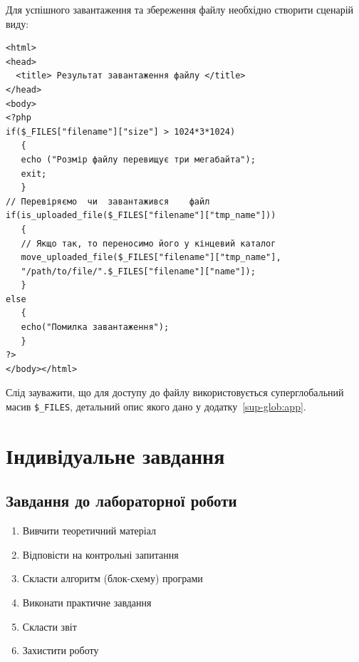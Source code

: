 Для успішного завантаження та збереження файлу необхідно створити сценарій виду:


\begin{lstlisting}[caption=Завантаження файлу на сервер]
<html>
<head>
  <title> Результат завантаження файлу </title>
</head>
<body>
<?php
if($_FILES["filename"]["size"] > 1024*3*1024)
   {
   echo ("Розмір файлу перевищує три мегабайта");
   exit;
   }
// Перевіряємо	чи	завантажився	файл
if(is_uploaded_file($_FILES["filename"]["tmp_name"]))
   {
   // Якщо так, то переносимо його у кінцевий каталог
   move_uploaded_file($_FILES["filename"]["tmp_name"], 
   "/path/to/file/".$_FILES["filename"]["name"]);
   } 
else 
   {
   echo("Помилка завантаження");
   }
?>
</body></html>
\end{lstlisting}

Слід зауважити, що для доступу до файлу використовується суперглобальний масив \verb'$_FILES', детальний опис якого дано у додатку~\ref{sup-glob:app}.



 
\pagebreak[3]
\section{Індивідуальне завдання}

\nopagebreak[4]
\subsection*{Завдання до лабораторної роботи}
\nopagebreak[4]
\begin{enumerate}
\item Вивчити теоретичний матеріал
\item Відповісти на контрольні запитання
\item Скласти алгоритм (блок-схему) програми
\item Виконати практичне завдання
\item Скласти звіт
\item Захистити роботу
\end{enumerate}

